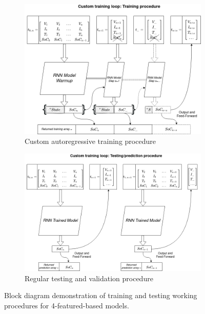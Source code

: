 \begin{figure}[htbp]
    \centering
    \begin{subfigure}[b]{0.85\textwidth}
        \centering
        \includegraphics[width=\linewidth]{II_Body/images/Autoregression-Training.png}
        \caption{Custom autoregressive training procedure}
        \label{subfig:training}
    \end{subfigure}
    \hfill
    \begin{subfigure}[b]{0.85\textwidth}
        \centering
        \includegraphics[width=\linewidth]{II_Body/images/Autoregression-Testing.png}
        \caption{Regular testing and validation procedure}
        \label{subfig:testing}
    \end{subfigure}
    \caption{Block diagram demonstration of training and testing working procedures for 4-featured-based models.}
    \label{fig:training_testing}
\end{figure}

